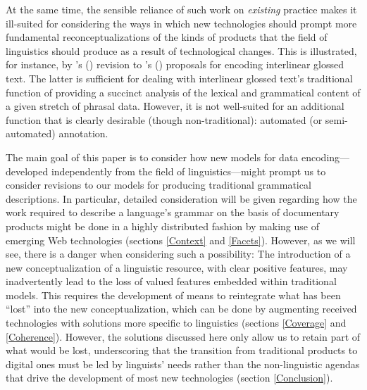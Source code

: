 \documentclass[12pt]{article}
\newcommand{\sref}[1]{section \ref{#1}}
\newcommand{\quotecite}[1]{\citeauthor{#1}'s (\citeyear{#1})}
\begin{document}
At the same time, the sensible reliance of such work on \emph{existing} practice
makes it ill-suited for considering the ways in which new technologies should
prompt more fundamental reconceptualizations of the kinds of products that the
field of linguistics should produce as a result of technological changes. This
is illustrated, for instance, by \quotecite{PalmerErk:2007} revision to
\quotecite{BBB:2003} proposals for encoding interlinear glossed text. The
latter is sufficient for dealing with interlinear glossed text's traditional
function of providing a succinct analysis of the lexical and grammatical content
of a given stretch of phrasal data. However, it is not well-suited for an
additional function that is clearly desirable (though non-traditional):
automated (or semi-automated) annotation.

The main goal of this paper is to consider how new models for data
encoding---developed independently from the field of linguistics---might prompt
us to consider revisions to our models for producing traditional grammatical
descriptions. In particular, detailed consideration will be given regarding how
the work required to describe a language's grammar on the basis of documentary
products might be done in a highly distributed fashion by making use of emerging
Web technologies (sections \ref{Context} and \ref{Facets}). However, as we will
see, there is a danger when considering such a possibility: The introduction of
a new conceptualization of a linguistic resource, with clear positive features,
may inadvertently lead to the loss of valued features embedded within
traditional models. This requires the development of means to reintegrate what
has been ``lost'' into the new conceptualization, which can be done by
augmenting received technologies with solutions more specific to linguistics
(sections \ref{Coverage} and \ref{Coherence}). However, the solutions discussed
here only allow us to retain part of what would be lost, underscoring that the
transition from traditional products to digital ones must be led by linguists'
needs rather than the non-linguistic agendas that drive the development of most
new technologies (\sref{Conclusion}).
\end{document}
